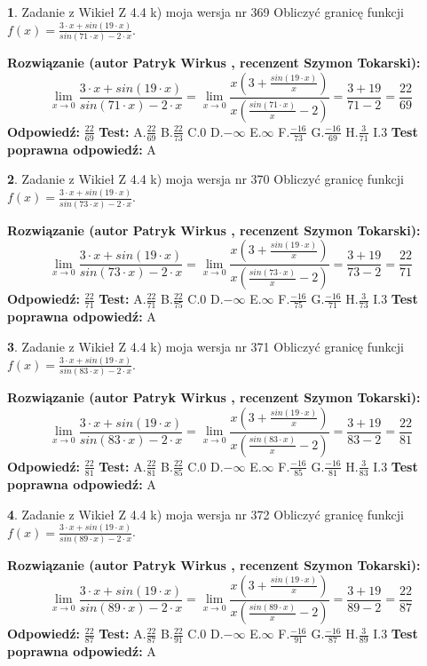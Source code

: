 \documentclass[12pt, a4paper]{article}
\theoremstyle{definition} %
\newtheorem{zad}{}
\newcommand{\zadStart}[1]{\begin{zad}#1\newline}
\newcommand{\zadStop}{\end{zad}}
\newcommand{\rozwStart}[2]{\noindent \textbf{Rozwiązanie (autor #1 , recenzent #2): }\newline}
\newcommand{\rozwStop}{\newline}
\newcommand{\odpStart}{\noindent \textbf{Odpowiedź:}\newline}
\newcommand{\odpStop}{\newline}
\newcommand{\testStart}{\noindent \textbf{Test:}\newline}
\newcommand{\testStop}{\newline}
\newcommand{\kluczStart}{\noindent \textbf{Test poprawna odpowiedź:}\newline}
\newcommand{\kluczStop}{\newline}
\begin{document}
\zadStart{Zadanie z Wikieł Z 4.4 k) moja wersja nr 369}
Obliczyć granicę funkcji $f(x)=\frac{3\cdot x +sin(19\cdot x)}{sin(71\cdot x) -2\cdot x}$.
\zadStop
\rozwStart{Patryk Wirkus}{Szymon Tokarski}
$$\lim\limits_{x\to 0}\frac{3\cdot x +sin(19\cdot x)}{sin(71\cdot x) -2\cdot x}
=\lim\limits_{x\to 0}\frac{x(3+\frac{sin(19\cdot x)}{x})}{x(\frac{sin(71\cdot x)}{x}-2)}
=\frac{3+19}{71-2} = \frac{22}{69}$$
\rozwStop
\odpStart
$\frac{22}{69}$
\odpStop
\testStart
A.$\frac{22}{69}$
B.$\frac{22}{73}$
C.$0$
D.$-\infty$
E.$\infty$
F.$\frac{-16}{73}$
G.$\frac{-16}{69}$
H.$\frac{3}{71}$
I.$3$
\testStop
\kluczStart
A
\kluczStop



\zadStart{Zadanie z Wikieł Z 4.4 k) moja wersja nr 370}
Obliczyć granicę funkcji $f(x)=\frac{3\cdot x +sin(19\cdot x)}{sin(73\cdot x) -2\cdot x}$.
\zadStop
\rozwStart{Patryk Wirkus}{Szymon Tokarski}
$$\lim\limits_{x\to 0}\frac{3\cdot x +sin(19\cdot x)}{sin(73\cdot x) -2\cdot x}
=\lim\limits_{x\to 0}\frac{x(3+\frac{sin(19\cdot x)}{x})}{x(\frac{sin(73\cdot x)}{x}-2)}
=\frac{3+19}{73-2} = \frac{22}{71}$$
\rozwStop
\odpStart
$\frac{22}{71}$
\odpStop
\testStart
A.$\frac{22}{71}$
B.$\frac{22}{75}$
C.$0$
D.$-\infty$
E.$\infty$
F.$\frac{-16}{75}$
G.$\frac{-16}{71}$
H.$\frac{3}{73}$
I.$3$
\testStop
\kluczStart
A
\kluczStop



\zadStart{Zadanie z Wikieł Z 4.4 k) moja wersja nr 371}
Obliczyć granicę funkcji $f(x)=\frac{3\cdot x +sin(19\cdot x)}{sin(83\cdot x) -2\cdot x}$.
\zadStop
\rozwStart{Patryk Wirkus}{Szymon Tokarski}
$$\lim\limits_{x\to 0}\frac{3\cdot x +sin(19\cdot x)}{sin(83\cdot x) -2\cdot x}
=\lim\limits_{x\to 0}\frac{x(3+\frac{sin(19\cdot x)}{x})}{x(\frac{sin(83\cdot x)}{x}-2)}
=\frac{3+19}{83-2} = \frac{22}{81}$$
\rozwStop
\odpStart
$\frac{22}{81}$
\odpStop
\testStart
A.$\frac{22}{81}$
B.$\frac{22}{85}$
C.$0$
D.$-\infty$
E.$\infty$
F.$\frac{-16}{85}$
G.$\frac{-16}{81}$
H.$\frac{3}{83}$
I.$3$
\testStop
\kluczStart
A
\kluczStop



\zadStart{Zadanie z Wikieł Z 4.4 k) moja wersja nr 372}
Obliczyć granicę funkcji $f(x)=\frac{3\cdot x +sin(19\cdot x)}{sin(89\cdot x) -2\cdot x}$.
\zadStop
\rozwStart{Patryk Wirkus}{Szymon Tokarski}
$$\lim\limits_{x\to 0}\frac{3\cdot x +sin(19\cdot x)}{sin(89\cdot x) -2\cdot x}
=\lim\limits_{x\to 0}\frac{x(3+\frac{sin(19\cdot x)}{x})}{x(\frac{sin(89\cdot x)}{x}-2)}
=\frac{3+19}{89-2} = \frac{22}{87}$$
\rozwStop
\odpStart
$\frac{22}{87}$
\odpStop
\testStart
A.$\frac{22}{87}$
B.$\frac{22}{91}$
C.$0$
D.$-\infty$
E.$\infty$
F.$\frac{-16}{91}$
G.$\frac{-16}{87}$
H.$\frac{3}{89}$
I.$3$
\testStop
\kluczStart
A
\kluczStop
\end{document}
